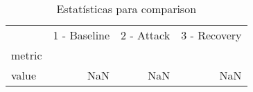 \begin{table}[htbp]
\caption{Estatísticas para comparison}
\label{tab:comparison_skewness}
\begin{tabular}{lrrr}
\toprule
 & 1 - Baseline & 2 - Attack & 3 - Recovery \\
metric &  &  &  \\
\midrule
value & NaN & NaN & NaN \\
\bottomrule
\end{tabular}
\end{table}
